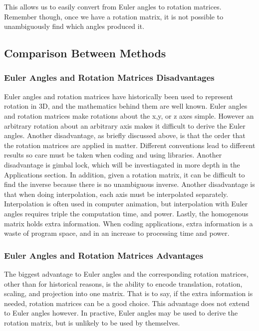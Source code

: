 This allows us to easily convert from Euler angles to rotation matrices.
Remember though, once we have a rotation matrix, it is not possible to unambiguously find which angles produced it.

\subsubsection{}

\subsection{Comparison Between Methods}
\subsubsection{Euler Angles and Rotation Matrices Disadvantages}
Euler angles and rotation matrices have historically been used to represent rotation in 3D, and the mathematics behind them are well known.
Euler angles and rotation matrices make rotations about the x,y, or z axes simple.
However an arbitrary rotation about an arbitrary axis makes it difficult to derive the Euler angles.
Another disadvantage, as briefly discussed above, is that the order that the rotation matrices are applied in matter.
Different conventions lead to different results so care must be taken when coding and using libraries.
Another disadvantage is gimbal lock, which will be investiagated in more depth in the Applications section.
In addition, given a rotation matrix, it can be difficult to find the inverse because there is no unambiguous inverse.
Another disadvantage is that when doing interpolation, each axis must be interpolated separately.
Interpolation is often used in computer animation, but interpolation with Euler angles requires triple the computation time, and power.
Lastly, the homogenous matrix holds extra information.
When coding applications, extra information is a waste of program space, and in an increase to processing time and power.
\subsubsection{Euler Angles and Rotation Matrices Advantages}
The biggest advantage to Euler angles and the corresponding rotation matrices, other than for historical reasons, is the ability to encode translation, rotation, scaling, and projection into one matrix.
That is to say, if the extra information is needed, rotation matrices can be a good choice.
This advantage does not extend to Euler angles however.
In practive, Euler angles may be used to derive the rotation matrix, but is unlikely to be used by themselves.
